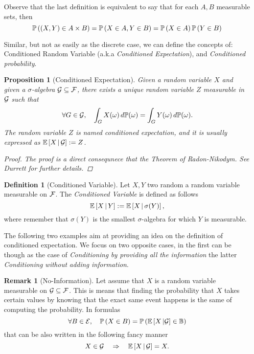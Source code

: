 \documentclass{report}
\newtheorem{prop}{Proposition}
\theoremstyle{definition}
\newtheorem{defn}{Definition}
\newtheorem{oss}{Remark}
\begin{document}
Observe that the last definition is equivalent to say that for each $A,B$
measurable sets, then
\begin{equation}
  \mathbb{P}\left( \left( X,Y \right)\in A\times B \right) = \mathbb{P}\left( X\in A, Y\in B\right) = \mathbb{P}\left(X\in A\right)\mathbb{P}\left( Y\in B \right)
\end{equation}

Similar, but not as easily as the discrete case, we can define the concepts
of: Conditioned Random Variable (a.k.a \textit{Conditioned Expectation}), and
\textit{Conditioned probability}.

\begin{prop}[Conditioned Expectation]
  Given a random variable $X$ and given a $\sigma$-algebra $\mathcal{G}\subseteq\mathcal{F}$,
  there exists a unique random variable $Z$ measurable in $\mathcal{G}$ such that
  \[
    \forall G\in\mathcal{G},\quad \int_G X(\omega)\,d\mathbb{P}(\omega)=\int_G
    Y(\omega)\,d\mathbb{P}(\omega).
  \]
  The random variable $Z$ is named \textit{conditioned expectation}, and it is
  usually expressed as $\mathbb{E}\left[ X\,\vert\,\mathcal{G} \right]:=Z$.
  \begin{proof}
    The proof is a direct consequnece that the Theorem of Radon-Nikodym. See
    Durrett for further details.
  \end{proof}
\end{prop}

\begin{defn}[Conditioned Variable]
  Let $X,Y$ two random a random variable measurable on $\mathcal{F}$. The
  \textit{Conditioned Variable} is defined as follows
  \begin{equation}
    \mathbb{E}\left[ X\,\vert\,Y \right]:=\mathbb{E}\left[ X\,\vert\, \sigma(Y) \right],
  \end{equation}
  where remember that $\sigma(Y)$ is the smallest $\sigma$-algebra for which
  $Y$ is measurable.
\end{defn}


The following two examples aim at providing an idea on the definition of
conditioned expectation. We focus on two opposite cases, in the first can be
though as the case of \textit{Conditioning by providing all the information}
the latter \textit{Conditioning without adding information}.

\begin{oss}[No-Information]
  Let assume that $X$ is a random variable measurable on $\mathcal{G}\subseteq \mathcal{F}$.
  This is means that finding the probability that $X$ takes certain values
  by knowing that the exact same event happens is the same of computing the
  probability. In formulas
  \begin{equation}
    \forall B\in\mathcal{E},\quad \mathbb{P}\left(X\in B\right) =\mathbb{P}\left( \mathbb{E}\left[ X\,\vert
        \mathcal{G} \right]\in\mathbb{B} \right)
  \end{equation}
  that can be also written in the following fancy manner
  \begin{equation}
    X\in\mathcal{G}\quad \Rightarrow\quad \mathbb{E}\left[ X\,\vert\,\mathcal{G} \right] = X.
  \end{equation}
\end{oss}
\end{document}
